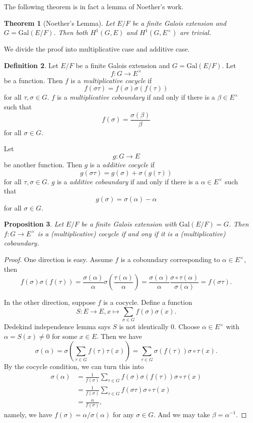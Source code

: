 \documentclass[12pt]{report}
\newtheorem{theorem}{Theorem}[section]
\newtheorem{proposition}[theorem]{Proposition}
{\theoremstyle{remark}\newtheorem*{remark}{Remark}}
\theoremstyle{definition}
\newtheorem{definition}[theorem]{Definition}
\newcommand{\Gal}{\text{Gal}}
\begin{document}
The following theorem is in fact a lemma of Noether's work.

\begin{theorem}[Noether's Lemma]
	Let $E/F$ be a finite Galois extension and $G=\Gal(E/F)$. Then both $H^1(G,E)$ and $H^1(G,E^\times)$ are trivial.
\end{theorem}

We divide the proof into multiplicative case and additive case.

\begin{definition}
	Let $E/F$ be a finite Galois extension and $G=\Gal(E/F)$. Let $$f: G\to E^\times$$ be a function. Then $f$ is a \emph{multiplicative cocycle} if $$f(\sigma\tau)=f(\sigma)\sigma(f(\tau))$$ for all $\tau,\sigma\in G$. $f$ is a \emph{multiplicative coboundary} if and only if there is a $\beta\in E^\times$ such that $$f(\sigma)=\frac{\sigma(\beta)}{\beta}$$ for all $\sigma\in G$.


	Let $$g: G\to E$$ be another function.  Then $g$ is a \emph{additive cocycle} if $$g(\sigma\tau)=g(\sigma)+\sigma(g(\tau))$$ for all $\tau,\sigma\in G$. $g$ is a \emph{additive coboundary} if and only if there is a $\alpha\in E^\times$ such that $$g(\sigma)=\sigma(\alpha) -\alpha$$ for all $\sigma\in G$.
\end{definition}

\begin{proposition}
	Let $E/F$ be a finite Galois extension with $\Gal(E/F)=G$. Then $f: G\to E^\times$ is a (multiplicative) cocycle if and ony if it is a (multiplicative) coboundary.
\end{proposition}

\begin{proof}
	One direction is easy. Assume $f$ is a coboundary corresponding to $\alpha\in E^\times$, then $$f(\sigma)\sigma(f(\tau))=\frac{\sigma(\alpha)}{\alpha}\sigma(\frac{\tau(\alpha)}{\alpha})=\frac{\sigma(\alpha)}{\alpha}\frac{\sigma\circ\tau(\alpha)}{\sigma(\alpha)}=f(\sigma\tau).$$

	In the other direction, suppose $f$ is a cocycle. Define a function $$S:E\to E,x\mapsto \sum_{\sigma\in G} f(\sigma)\sigma(x).$$ Dedekind independence lemma says $S$ is not identically 0. Choose $\alpha\in E^\times$ with $\alpha=S(x)\not= 0$ for some $x\in E$. Then we have $$\sigma(\alpha)=\sigma(\sum_{\tau\in G} f(\tau)\tau(x))=\sum_{\tau \in G} \sigma(f(\tau)) \sigma\circ\tau(x).$$
	By the cocycle condition, we can turn this into
	\begin{align*}
		\sigma(\alpha) & = \frac{1}{f(\sigma)}\sum_{\tau \in G} f(\sigma)\sigma(f(\tau)) \sigma\circ\tau(x) \\
		               & =\frac{1}{f(\sigma)} \sum_{\tau \in G} f(\sigma\tau) \sigma\circ\tau(x)            \\
		               & =\frac{\alpha}{f(\sigma)},
	\end{align*}
	namely, we have $f(\sigma)=\alpha/\sigma(\alpha)$ for any $\sigma\in G$. And we may take $\beta=\alpha^{-1}$.
\end{proof}
\end{document}
